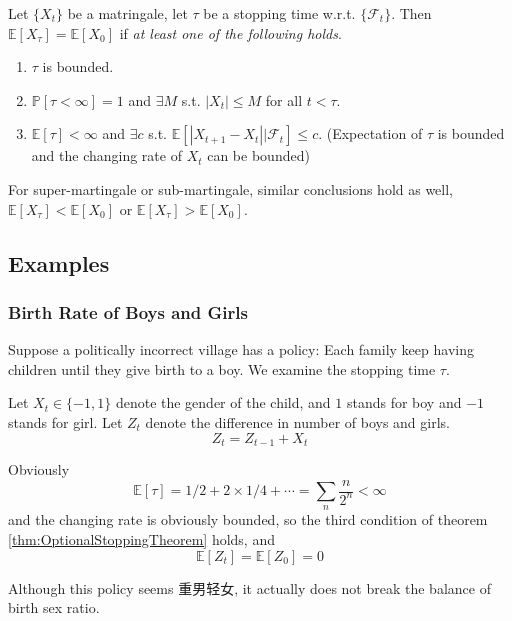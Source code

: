         \begin{theorem}\label{thm:OptionalStoppingTheorem}
            Let $\{X_t\}$ be a matringale, let $\tau$ be a stopping time w.r.t. $\{\mathcal{F}_t\}$. Then $\mathbb{E}[X_{\tau}] = \mathbb{E}[X_0]$ if \emph{at least one of the following holds}.
            \begin{enumerate}
                \item $\tau$ is bounded.
                \item $\mathbb{P}[\tau < \infty] = 1$ and $\exists M$ s.t. $|X_t| \le M$ for all $t < \tau$.
                \item $\mathbb{E}[\tau] < \infty$ and $\exists c$ s.t. $\mathbb{E}[|X_{t+1} - X_{t}||\mathcal{F}_t] \le c$. (Expectation of $\tau$ is bounded and the changing rate of $X_t$ can be bounded)
            \end{enumerate}
        \end{theorem}
        \begin{remark}
            For super-martingale or sub-martingale, similar conclusions hold as well, $\mathbb{E}[X_{\tau}] < \mathbb{E}[X_0]$ or $\mathbb{E}[X_{\tau}] > \mathbb{E}[X_0]$.
        \end{remark}

    \subsection{Examples}
        \subsubsection{Birth Rate of Boys and Girls}
            Suppose a politically incorrect village has a policy: Each family keep having children until they give birth to a boy. We examine the stopping time $\tau$.

            Let $X_t \in \{-1, 1\}$ denote the gender of the child, and $1$ stands for boy and $-1$ stands for girl. Let $Z_t$ denote the difference in number of boys and girls.
            \[ Z_t = Z_{t-1} + X_t \]

            Obviously
            \[ \mathbb{E}[\tau] = 1/2 + 2 \times 1/4 + \cdots = \sum_n \frac{n}{2^n} < \infty \]
            and the changing rate is obviously bounded, so the third condition of theorem \ref{thm:OptionalStoppingTheorem} holds, and
            \[ \mathbb{E}[Z_t] = \mathbb{E}[Z_0] = 0 \]

            Although this policy seems 重男轻女, it actually does not break the balance of birth sex ratio.

